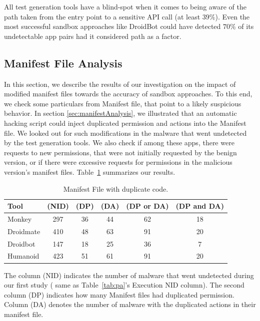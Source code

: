 \begin{obs}{2}{}
 All test generation tools have a blind-spot when it comes to being aware of the path taken from the entry point to a sensitive API call (at least $39\%$). Even the most successful sandbox approaches like DroidBot could have detected $70\%$ of its undetectable app pairs had it considered path as a factor. 
\end{obs}


\subsection{Manifest File Analysis}\label{sec:manifest}

In this section, we describe the results of our investigation on the impact of modified manifest files towards the accuracy of sandbox approaches. 
To this end, we check some particulars from Manifest file, that point to a likely suspicious behavior. In section \ref{sec:manifestAnalysis}, we illustrated that an automatic hacking script could inject duplicated permission and actions into the Manifest file. We looked out for such modifications in the malware that went undetected by the test generation tools. We also check if among these apps, there were requests to new permissions, that were not initially requested by the benign version, or if there were excessive requests for permissions in the malicious version's manifest files. Table~\ref{tab:mfa} summarizes our results. 

\begin{table}[ht]
  \caption{Manifest File with duplicate code.}
  \centering
  \begin{small}
 \begin{tabular}{lccccc}
   \toprule
   Tool & (NID) & (DP) & (DA) & (DP or DA) & (DP and DA) \\   \midrule
   Monkey &  297 & 36 & 44 & 62 & 18 \\ 
   Droidmate &  410 & 48 & 63 & 91 & 20 \\ 
   Droidbot &  147 & 18 & 25 & 36 & 7 \\ 
   Humanoid &  423 & 51 & 61 & 91 & 20 \\ 
 \bottomrule
 \end{tabular}
 \end{small}
 \label{tab:mfa}
\end{table}

The column (NID) indicates the number of malware that went undetected during our first study ( same as Table~\ref{tab:pa}'s Execution NID column). The second column (DP) indicates how many Manifest files had duplicated permission. Column (DA) denotes the number of malware with the duplicated actions in their manifest file.

